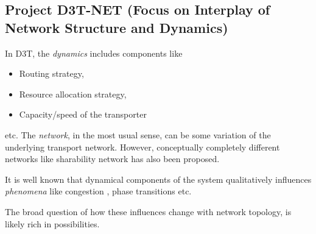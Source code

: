 \subsection*{Project D3T-NET (Focus on Interplay of Network Structure and Dynamics)}
In D3T, the \emph{dynamics} includes components like 
\begin{itemize}
\item Routing strategy,
\item Resource allocation strategy,
\item Capacity/speed of the transporter
\end{itemize}
etc. The \emph{network}, in the most usual sense, can be some variation of the underlying transport network. However, 
conceptually completely different networks like sharability network \cite{santi_quantifying_2014} has also been proposed. 

It is well known that dynamical components \cite{zhang_probability_2013,guan_efficient_2013,santi_quantifying_2014} of the system qualitatively influences \emph{phenomena} like
congestion \cite{hyytia_congestive_2010, de_martino_congestion_2009}, phase transitions \cite{barankai_effect_2012}  etc. 

The broad question of how these influences change with network topology, is likely rich in possibilities.

